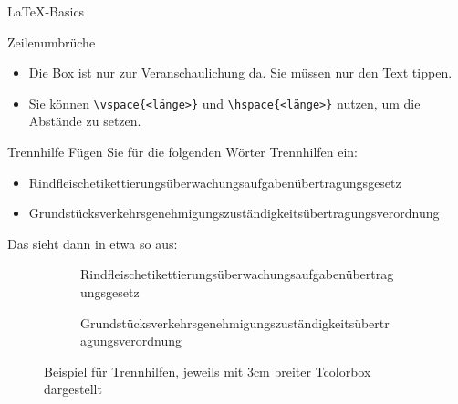 \documentclass[
    inlineshortcut=java, %
    corporatedesign, %
    boxarc, %
]{algoexercise}
\begin{document}
\begin{task}[points=auto]{\LaTeX-Basics}
\begin{subtask*}[points=1]{Zeilenumbrüche}
            \begin{hinweise}
                \begin{itemize}
                    \item Die Box ist nur zur Veranschaulichung da. Sie müssen nur den Text tippen.
                    \item Sie können \verb+\vspace{<länge>}+ und \verb+\hspace{<länge>}+ nutzen, um die Abstände zu setzen.
                \end{itemize}
            \end{hinweise}
        \end{subtask*}
        \clearpage{}
        \begin{subtask*}[points=1]{Trennhilfe}
            Fügen Sie für die folgenden Wörter Trennhilfen ein:
            \begin{itemize}
                \item Rindfleischetikettierungsüberwachungsaufgabenübertragungsgesetz
                \item Grundstücksverkehrsgenehmigungszuständigkeitsübertragungsverordnung
            \end{itemize}
            Das sieht dann in etwa so aus:
            \begin{figure}[ht!]
                \centering
                \begin{subfigure}[t]{.5\textwidth}
                    \centering
                    \begin{tcolorbox}[width=3cm]
                        Rind\-flei\-sche\-ti\-ket\-tie\-rungs\-über\-wa\-chungs\-auf\-ga\-ben\-über\-tra\-gungs\-ge\-setz
                    \end{tcolorbox}
                \end{subfigure}%
                \begin{subfigure}[t]{.5\textwidth}
                    \centering
                    \begin{tcolorbox}[width=3cm]
                        Grund\-stücks\-ver\-kehrs\-ge\-neh\-mi\-gungs\-zu\-stän\-dig\-keits\-über\-tra\-gungs\-ver\-ord\-nung
                    \end{tcolorbox}
                \end{subfigure}
                \caption{Beispiel für Trennhilfen, jeweils mit 3cm breiter Tcolorbox dargestellt}

\end{figure}
\end{subtask*}
\end{task}
\end{document}
